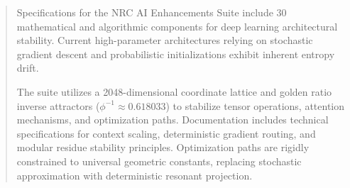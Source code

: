 \vspace{0.2cm}
\begin{abstract}
	Specifications for the NRC AI Enhancements Suite include 30 mathematical and algorithmic components for deep learning architectural stability. Current high-parameter architectures relying on stochastic gradient descent and probabilistic initializations exhibit inherent entropy drift.

	The suite utilizes a 2048-dimensional coordinate lattice and golden ratio inverse attractors ($\phi^{-1} \approx 0.618033$) to stabilize tensor operations, attention mechanisms, and optimization paths. Documentation includes technical specifications for context scaling, deterministic gradient routing, and modular residue stability principles. Optimization paths are rigidly constrained to universal geometric constants, replacing stochastic approximation with deterministic resonant projection.
\end{abstract}
